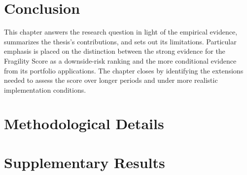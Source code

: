 \documentclass[12pt,a4paper]{report}
\begin{document}











\chapter{Conclusion}
\label{chap:conclusion}

This chapter answers the research question in light of the empirical evidence, summarizes the thesis's contributions, and sets out its limitations. Particular emphasis is placed on the distinction between the strong evidence for the Fragility Score as a downside-risk ranking and the more conditional evidence from its portfolio applications. The chapter closes by identifying the extensions needed to assess the score over longer periods and under more realistic implementation conditions.







\clearpage
\printbibliography[
    heading=bibintoc,
    title={References}
]


\appendix
\chapter{Methodological Details}
\label{chap:methodology_appendix}


\chapter{Supplementary Results}
\label{chap:results_appendix}



%
% 
\end{document}
